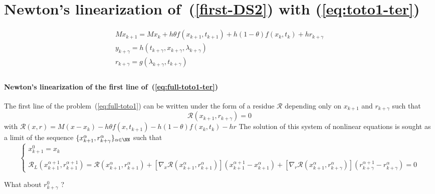 \section{Newton's linearization of~(\ref{first-DS2}) with  (\ref{eq:toto1-ter}) } 

  \begin{equation}
    \begin{array}{l}
      \label{eq:full-toto1-ter}
      M x_{k+1} = M x_{k} +h \theta f(x_{k+1},t_{k+1}) +h(1-\theta)f(x_{k},t_{k}) + h r_{k+\gamma} \\[2mm]
      y_{k+\gamma} =  h(t_{k+\gamma},x_{k+\gamma},\lambda _{k+\gamma}) \\[2mm]
      r_{k+\gamma} = g(\lambda_{k+\gamma},t_{k+\gamma})\\[2mm]
    \end{array}
\end{equation}

 \paragraph{Newton's linearization of the first line of~(\ref{eq:full-toto1-ter})} The first line of the  problem~(\ref{eq:full-toto1}) can be written under the form of a residue $\mathcal R$ depending only on $x_{k+1}$ and $r_{k+\gamma}$ such that 
\begin{equation}
  \label{eq:full-NL3}
  \mathcal R (x_{k+1},r _{k+\gamma}) =0
\end{equation}
with $\mathcal R(x,r) = M(x - x_{k}) -h\theta f( x , t_{k+1}) - h(1-\theta)f(x_k,t_k) - h r $
The solution of this system of nonlinear equations is sought as a limit of the sequence $\{ x^{\alpha}_{k+1},r^{\alpha}_{k+\gamma} \}_{\alpha \in \NN}$ such that
 \begin{equation}
   \label{eq:full-NL7}
   \begin{cases}
     x^{0}_{k+1} = x_k \\ \\
     \mathcal R_L( x^{\alpha+1}_{k+1},r^{\alpha+1}_{k+1}) = \mathcal
     R(x^{\alpha}_{k+1},r^{\alpha}_{k+1})  + \left[ \nabla_{x} \mathcal
     R(x^{\alpha}_{k+1},r^{\alpha}_{k+1})\right] (x^{\alpha+1}_{k+1}-x^{\alpha}_{k+1} ) +
     \left[ \nabla_{r} \mathcal R(x^{\alpha}_{k+1},r^{\alpha}_{k+\gamma})\right] (r^{\alpha+1}_{k+\gamma} - r^{\alpha}_{k+\gamma} ) =0
 \end{cases}
\end{equation}
\begin{ndrva}
  What about $r^0_{k+\gamma}$ ?
\end{ndrva}

